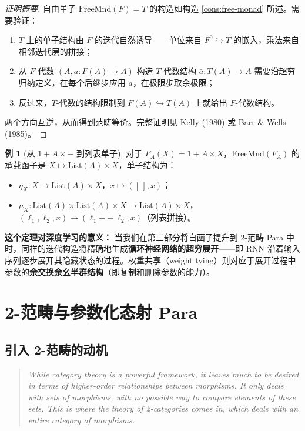\documentclass[12pt,a4paper]{ctexart}
\theoremstyle{definition}
\newtheorem{example}[definition]{例}
\newcommand{\cat}[1]{\mathbf{#1}}
\newcommand{\Para}{\cat{Para}}
\newcommand{\FreeMnd}{\mathrm{FreeMnd}}
\newcommand{\List}{\mathrm{List}}
\begin{document}
\begin{proof}[证明概要]
自由单子 $\FreeMnd(F)=T$ 的构造如构造 \ref{cons:free-monad} 所述。需要验证：
\begin{enumerate}[nosep]
    \item $T$ 上的单子结构由 $F$ 的迭代自然诱导——单位来自 $F^0\hookrightarrow T$ 的嵌入，乘法来自相邻迭代层的拼接；
    \item 从 $F$-代数 $(A,a:F(A)\to A)$ 构造 $T$-代数结构 $\bar a:T(A)\to A$ 需要沿超穷归纳定义，在每个后继步应用 $a$，在极限步取余极限；
    \item 反过来，$T$-代数的结构限制到 $F(A)\hookrightarrow T(A)$ 上就给出 $F$-代数结构。
\end{enumerate}
两个方向互逆，从而得到范畴等价。完整证明见 Kelly (1980) 或 Barr \& Wells (1985)。
\end{proof}

\begin{example}[从 $1+A\times-$ 到列表单子]
对于 $F_A(X)=1+A\times X$，$\FreeMnd(F_A)$ 的承载函子是 $X\mapsto\List(A)\times X$，单子结构为：
\begin{itemize}[nosep]
    \item $\eta_X:X\to\List(A)\times X$，$x\mapsto([\,],x)$；
    \item $\mu_X:\List(A)\times\List(A)\times X\to\List(A)\times X$，$(\ell_1,\ell_2,x)\mapsto(\ell_1{+\!+}\ell_2,x)$（列表拼接）。
\end{itemize}
\end{example}

\textbf{这个定理对深度学习的意义：} 当我们在第三部分将自函子提升到 2-范畴 Para 中时，同样的迭代构造将精确地生成\textbf{循环神经网络的超穷展开}——即 RNN 沿着输入序列逐步展开其隐藏状态的过程。权重共享（weight tying）则对应于展开过程中参数的\textbf{余交换余幺半群结构}（即复制和删除参数的能力）。

\newpage

\section{2-范畴与参数化态射 $\Para$}

\subsection{引入 2-范畴的动机}

\begin{quote}
\itshape
While category theory is a powerful framework, it leaves much to be desired in terms of higher-order relationships between morphisms. It only deals with sets of morphisms, with no possible way to compare elements of these sets. This is where the theory of 2-categories comes in, which deals with an entire category of morphisms.
\end{quote}
\end{document}

